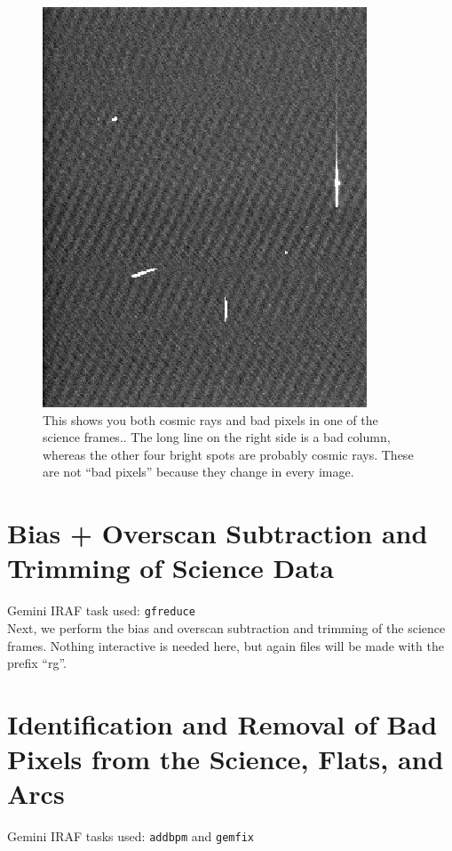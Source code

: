 \documentclass[12pt]{report}
\begin{document}
\begin{figure}[h]
\centering
\includegraphics[scale=0.8]{CRvsBP.jpeg}
\caption[Cosmic Rays vs. Bad Pixels]{This shows you both cosmic rays and bad pixels in one of the science frames.. The long line on the right side is a bad column, whereas the other four bright spots are probably cosmic rays. These are not ``bad pixels'' because they change in every image.}
\label{fig:badpix}
\end{figure}

\bigskip
\section{Bias + Overscan Subtraction and Trimming of Science Data}

\noindent Gemini IRAF task used: \texttt{gfreduce}\\

\noindent Next, we perform the bias and overscan subtraction and trimming of the science frames. Nothing interactive is needed here, but again files will be made with the prefix ``rg''.

\bigskip
\section{Identification and Removal of Bad Pixels from the Science, Flats, and Arcs}
\label{badpix}

\noindent Gemini IRAF tasks used: \texttt{addbpm} and \texttt{gemfix}\\
\end{document}
